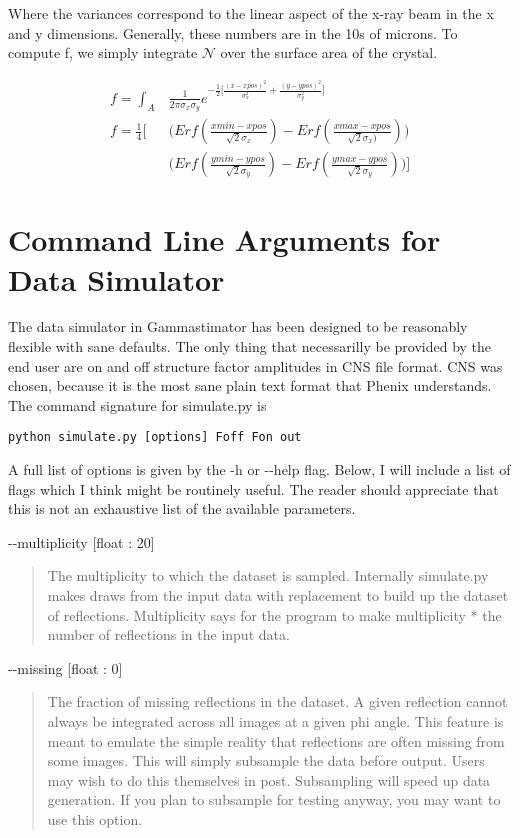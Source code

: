 \documentclass{report}
\begin{document}
Where the variances correspond to the linear aspect of the x-ray beam in the x and y dimensions. Generally, these numbers are in the 10s of microns. 
To compute f, we simply integrate $\mathcal{N}$ over the surface area of the crystal. 

\begin{equation}
\begin{aligned}
f = \int_A &\frac {1} {2\pi \sigma_x \sigma_y} e^{-\frac {1} {2} \big[ \frac {(x - xpos)^2}{\sigma_x^2} + \frac {(y - ypos)^2}{\sigma_y^2} \big]} \\
f = \frac {1} {4} \bigg[ &\bigg( Erf (\frac {xmin - xpos} {\sqrt {2} \sigma_x}) - Erf (\frac {xmax - xpos} {\sqrt {2} \sigma_x)} )\bigg)  \\
 &\bigg( Erf ( \frac {ymin - ypos} {\sqrt {2} \sigma_y}) - Erf (\frac {ymax - ypos} {\sqrt {2} \sigma_y}) \bigg)  \bigg]
\end{aligned}
\end{equation}

\section{Command Line Arguments for Data Simulator}
The data simulator in Gammastimator has been designed to be reasonably flexible with sane defaults. 
The only thing that necessarilly be provided by the end user are on and off structure factor amplitudes in CNS file format.
CNS was chosen, because it is the most sane plain text format that Phenix understands. 
The command signature for simulate.py is

\begin{lstlisting}
python simulate.py [options] Foff Fon out
\end{lstlisting}

A full list of options is given by the -h or -{}-help flag. 
Below, I will include a list of flags which I think might be routinely useful. 
The reader should appreciate that this is not an exhaustive list of the available parameters. 
\bigskip


\noindent
-{}-multiplicity [float : 20] 
\begin{quote}
    The multiplicity to which the dataset is sampled. 
    Internally simulate.py makes draws from the input data with replacement to build up the dataset of reflections. 
    Multiplicity says for the program to make multiplicity * the number of reflections in the input data.
\end{quote}

\noindent
-{}-missing [float : 0] 
\begin{quote}
    The fraction of missing reflections in the dataset. 
    A given reflection cannot always be integrated across all images at a given phi angle.
    This feature is meant to emulate the simple reality that reflections are often missing from some images.
    This will simply subsample the data before output. 
    Users may wish to do this themselves in post.
    Subsampling will speed up data generation.
    If you plan to subsample for testing anyway, you may want to use this option.
\end{quote}
\end{document}
